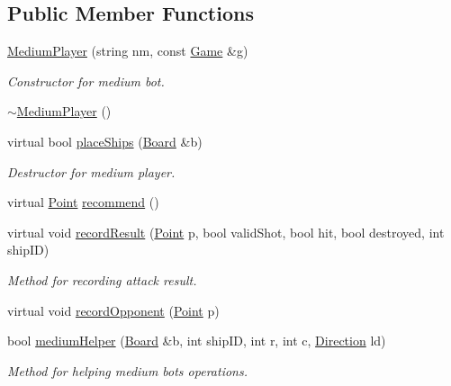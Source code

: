 \subsection*{Public Member Functions}
\begin{DoxyCompactItemize}
\item 
\mbox{\hyperlink{class_medium_player_ade2cbbd7600c6958afdd214414d62174}{Medium\+Player}} (string nm, const \mbox{\hyperlink{class_game}{Game}} \&g)
\begin{DoxyCompactList}\small\item\em Constructor for medium bot. \end{DoxyCompactList}\item 
\mbox{\hyperlink{class_medium_player_a59749832be9905531c9b5eb0b67edf83}{$\sim$\+Medium\+Player}} ()
\item 
virtual bool \mbox{\hyperlink{class_medium_player_ac4d4748e2c27a2a51033bbce9f12de26}{place\+Ships}} (\mbox{\hyperlink{class_board}{Board}} \&b)
\begin{DoxyCompactList}\small\item\em Destructor for medium player. \end{DoxyCompactList}\item 
virtual \mbox{\hyperlink{class_point}{Point}} \mbox{\hyperlink{class_medium_player_a2e99d57f30f3f7f929840b8cda16527d}{recommend}} ()
\item 
virtual void \mbox{\hyperlink{class_medium_player_aeadd8498cba5c447afbb5a0eb7408285}{record\+Result}} (\mbox{\hyperlink{class_point}{Point}} p, bool valid\+Shot, bool hit, bool destroyed, int ship\+ID)
\begin{DoxyCompactList}\small\item\em Method for recording attack result. \end{DoxyCompactList}\item 
virtual void \mbox{\hyperlink{class_medium_player_a6183d4a8fe3d68419afcfa9e33cd5928}{record\+Opponent}} (\mbox{\hyperlink{class_point}{Point}} p)
\item 
bool \mbox{\hyperlink{class_medium_player_a502c34f56cfe60def6d01de7c4f300e2}{medium\+Helper}} (\mbox{\hyperlink{class_board}{Board}} \&b, int ship\+ID, int r, int c, \mbox{\hyperlink{_globals_8h_a224b9163917ac32fc95a60d8c1eec3aa}{Direction}} ld)
\begin{DoxyCompactList}\small\item\em Method for helping medium bot\textquotesingle{}s operations. \end{DoxyCompactList}\item 

\end{DoxyCompactItemize}

